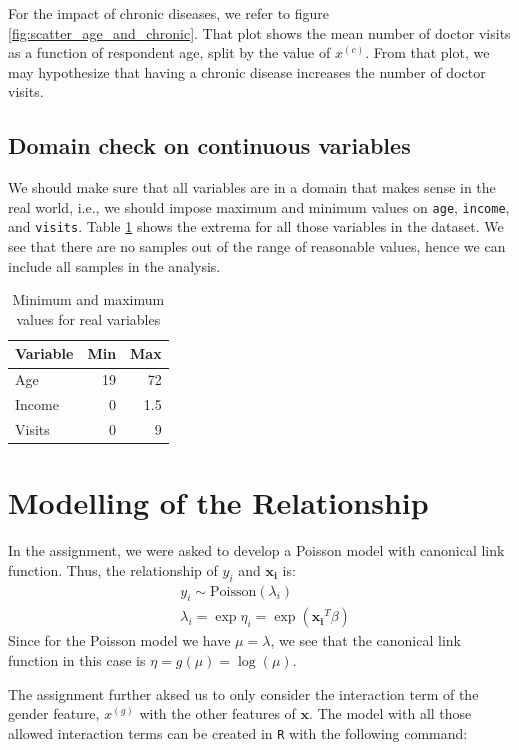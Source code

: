 \documentclass[a4paper,11pt]{article}
\begin{document}
For the impact of chronic diseases, we refer to figure \ref{fig:scatter_age_and_chronic}.  That plot shows the mean number of doctor visits as a function of respondent age, split by the value of $x^{(c)}$. From that plot, we may hypothesize that having a chronic disease increases the number of doctor visits. 

\subsection{Domain check on continuous variables}

We should make sure that all variables are in a domain that makes sense in the real world, i.e., we should impose maximum and minimum values on \texttt{age}, \texttt{income}, and \texttt{visits}. Table \ref{tab:min-max} shows the extrema for all those variables in the dataset. We see that there are no samples out of the range of reasonable values, hence we can include all samples in the analysis.

\begin{table}[h]
\centering
\begin{tabular}{l|r|r}
\hline
Variable & Min & Max\\
\hline
Age & 19 & 72 \\
Income & 0 & 1.5 \\
Visits & 0 & 9 \\
\hline
\end{tabular}
\caption{Minimum and maximum values for real variables}
\label{tab:min-max}

\end{table}


\section{Modelling of the Relationship}
In the assignment, we were asked to develop a Poisson model with canonical link function. Thus, the relationship of $y_i$ and $\mathbf{x_i}$ is:
\begin{align}
& y_i \sim \text{Poisson}(\lambda_i) \\
&\lambda_i = \exp{\eta_i} = \exp(\mathbf{x_i}^T\beta)
    \label{eq:model}
\end{align}
Since for the Poisson model we have $\mu = \lambda$, we see that the canonical link function in this case is $\eta = g(\mu) = \log(\mu)$.

The assignment further aksed us to only consider the interaction term of the gender feature, $x^{(g)}$ with the other features of $\mathbf{x}$. The model with all those allowed interaction terms can be created in \texttt{R} with the following command:
\end{document}
